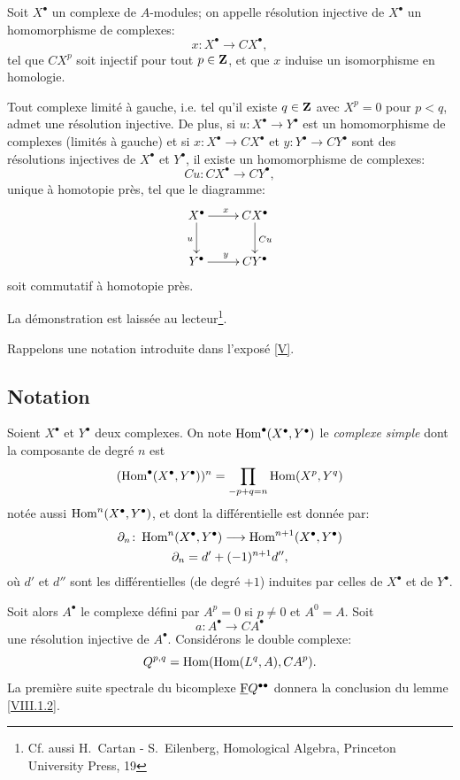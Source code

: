 \begin{definition} \label{VIII.1.3} Soit $X^\bullet$ un complexe de $A$-modules; on appelle r\'esolution injective de $X^\bullet$ un homomorphisme de complexes:
\[x\colon X^\bullet\to CX^\bullet, \]
tel que $CX^p$ soit injectif pour tout $p\in \mathbf{Z}$, et que $x$ induise un isomorphisme en homologie.
\end{definition}

\begin{proposition} \label{VIII.1.4} Tout complexe limit\'e \`a gauche, i.e. tel qu'il existe $q\in\mathbf{Z}$ avec $X^p=0$ pour $p<q$, admet une r\'esolution injective. De plus, si $u\colon X^\bullet\to Y^\bullet$ est un homomorphisme de complexes (limit\'es \`a gauche) et si $x\colon X^\bullet \to CX^\bullet$ et $y\colon Y^\bullet\to CY^\bullet$ sont des r\'esolutions injectives de $X^\bullet$ et $Y^\bullet$, il existe un homomorphisme de complexes:
\[Cu\colon CX^\bullet\to CY^\bullet, \]
unique \`a homotopie pr\`es, tel que le diagramme:
\[
\xymatrix{ X^\bullet \ar[r]^x\ar[d]_u & CX^\bullet\ar[d]^{Cu} \\
Y^\bullet \ar[r]^y & CY^\bullet \\
}\]
soit commutatif \`a homotopie pr\`es.
\end{proposition}

La d\'emonstration est laiss\'ee au lecteur\footnote{Cf. aussi H.~Cartan - S.~Eilenberg, Homological Algebra, Princeton University Press, 19}.

Rappelons une notation introduite dans l'expos\'e \ref{V}.

\subsection*{Notation}
Soient $X^\bullet$ et $Y^\bullet$ deux complexes. On note $\operatorname{Hom}^\bullet(X^\bullet, Y^\bullet)$ le \emph{complexe simple} dont la composante de degr\'e $n$ est
\[(\operatorname{Hom}^\bullet(X^\bullet, Y^\bullet))^n=\prod_{-p+q=n}\operatorname{Hom}(X^p, Y^q)\]
not\'ee aussi $\operatorname{Hom}^n(X^\bullet, Y^\bullet)$, et dont la diff\'erentielle est donn\'ee par:
\begin{gather*}
\partial_n\colon \Hom^n(X^\bullet, Y^\bullet)\to \Hom^{n+1}(X^\bullet, Y^\bullet)\\
\partial_n=d'+(-1)^{n+1}d'',
\end{gather*}
o\`u $d'$ et $d''$ sont les diff\'erentielles (de degr\'e $+1$) induites par celles de $X^\bullet$ et de $Y^\bullet$.

\setcounter{equation}{1} Soit alors $A^\bullet$ le complexe d\'efini par $A^p=0$ si $p\neq 0$ et $A^0=A$. Soit
\[a\colon A^\bullet \to CA^\bullet\]
une r\'esolution injective de $A^\bullet$. Consid\'erons le double complexe:
\begin{equation} \label{eq:VIII.1.2} Q^{p, q}=\operatorname{Hom}(\operatorname{Hom}(L^q, A), CA^p).
\end{equation}
La premi\`ere suite spectrale du bicomplexe ${\underline{\mathrm{F}}}Q^{\bullet\bullet}$ donnera la conclusion du lemme \ref{VIII.1.2}.

